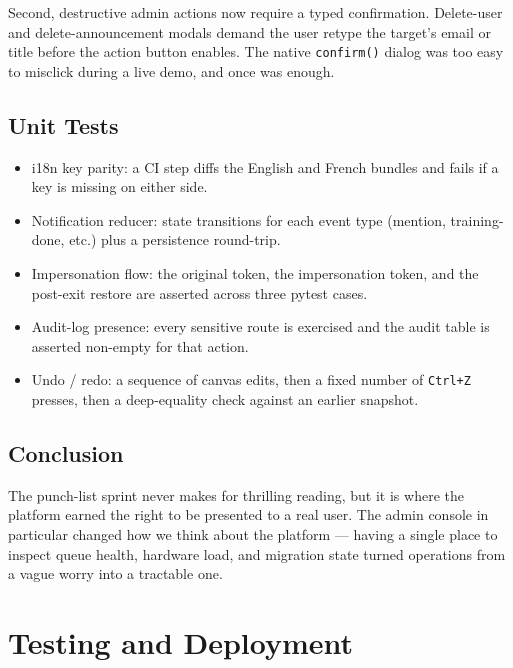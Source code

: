 \documentclass[12pt, a4paper, oneside]{report}
\begin{document}
Second, destructive admin actions now require a typed confirmation.
Delete-user and delete-announcement modals demand the user retype
the target's email or title before the action button enables. The
native \texttt{confirm()} dialog was too easy to misclick during a
live demo, and once was enough.

\section{Unit Tests}

\begin{itemize}
    \item i18n key parity: a CI step diffs the English and French
        bundles and fails if a key is missing on either side.
    \item Notification reducer: state transitions for each event
        type (mention, training-done, etc.) plus a persistence
        round-trip.
    \item Impersonation flow: the original token, the
        impersonation token, and the post-exit restore are
        asserted across three pytest cases.
    \item Audit-log presence: every sensitive route is exercised
        and the audit table is asserted non-empty for that action.
    \item Undo / redo: a sequence of canvas edits, then a fixed
        number of \texttt{Ctrl+Z} presses, then a deep-equality
        check against an earlier snapshot.
\end{itemize}

\section*{Conclusion}

The punch-list sprint never makes for thrilling reading, but it is
where the platform earned the right to be presented to a real user.
The admin console in particular changed how we think about the
platform --- having a single place to inspect queue health, hardware
load, and migration state turned operations from a vague worry into
a tractable one.

\chapter{Testing and Deployment}
\end{document}
